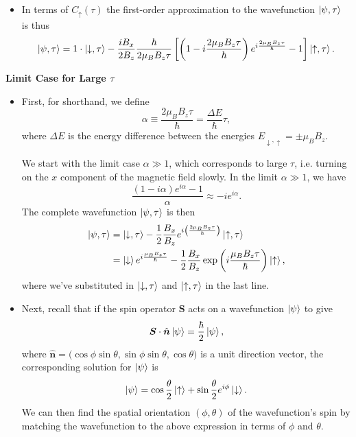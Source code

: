 \documentclass[11pt, a4paper]{article}
\renewcommand{\vec}[1]{\bm{#1}} %
\newcommand{\uvec}[1]{\hat{\vec{#1}}} %
\newcommand{\p}{\psi}  %
\newcommand{\ua}{\uparrow}  %
\newcommand{\da}{\downarrow}  %
\begin{document}
\begin{itemize}
	\item In terms of $ C_{\ua}(\tau) $ the first-order approximation to the wavefunction $ \ket{\p, \tau} $ is thus
	\begin{equation*}
		\ket{\p, \tau} = 1 \cdot \ket{\da, \tau} -\frac{iB_{x}}{2B_{z}} \frac{\hbar}{2\mu_{B}B_{z}\tau} \left[\left(1 - i \frac{2\mu_{B}B_{z}\tau}{\hbar}\right)e^{i\frac{2\mu_{B}B_{z}\tau}{\hbar}} - 1\right]\ket{\ua, \tau}.
	\end{equation*}
\end{itemize}

\textbf{Limit Case for Large $ \tau $}
\begin{itemize}	
	\item First, for shorthand, we define
	\begin{equation*}
        \alpha \equiv \frac{2\mu_{B}B_{z}\tau}{\hbar} = \frac{\Delta E}{\hbar}\tau,
	\end{equation*}
    where $ \Delta E $ is the energy difference between the energies $ E_{\da, \ua} = \pm \mu_{B}B_{z} $.

	We start with the limit case $ \alpha \gg 1 $, which corresponds to large $ \tau $, i.e. turning on the $ x $ component of the magnetic field slowly. In the limit $ \alpha \gg 1 $, we have
	\begin{equation*}
		\frac{(1 - i\alpha)e^{i\alpha}-1}{\alpha} \approx - i e^{i\alpha}.
	\end{equation*}
	The complete wavefunction $ \ket{\p, \tau} $ is then
	\begin{align*}
		\ket{\p, \tau} &= \ket{\da, \tau} -\frac{1}{2}\frac{B_{x}}{B_{z}} e^{i\left(\frac{2\mu_{B}B_{z}\tau}{\hbar}\right)}\ket{\ua, \tau}\\
		& = \ket{\da}e^{i\frac{\mu_{B}B_{z}\tau}{\hbar}} - \frac{1}{2}\frac{B_{x}}{B_{z}}\exp\left(i \frac{\mu_{B}B_{z}\tau}{\hbar}\right)\ket{\ua},
	\end{align*}
	where we've substituted in $ \ket{\da, \tau} $ and $ \ket{\ua, \tau} $ in the last line.
	
	\item Next, recall that if the spin operator $ \vec{S} $ acts on a wavefunction $ \ket{\p} $ to give
	\begin{equation*}
		\vec{S}\cdot \uvec{n} \ket{\p} = \frac{\hbar}{2} \ket{\p},
	\end{equation*}
	where $ \uvec{n} = \big(\cos \phi \sin \theta, \sin \phi \sin \theta, \cos \theta\big) $ is a unit direction vector, the corresponding solution for $ \ket{\p} $ is
	\begin{equation*}
		\ket{\p} = \cos \frac{\theta}{2}\ket{\ua} + \sin \frac{\theta}{2}e^{i\phi}\ket{\da}.
	\end{equation*}
	We can then find the spatial orientation $ (\phi, \theta) $ of the wavefunction's spin by matching the wavefunction to the above expression in terms of $ \phi $ and $ \theta $.
	

\end{itemize}
\end{document}
